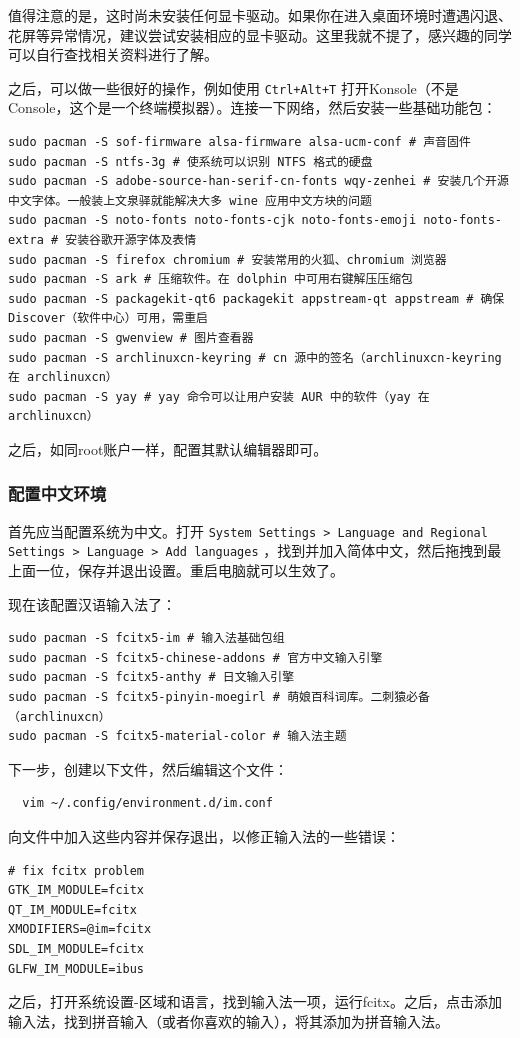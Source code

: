 值得注意的是，这时尚未安装任何显卡驱动。如果你在进入桌面环境时遭遇闪退、花屏等异常情况，建议尝试安装相应的显卡驱动。这里我就不提了，感兴趣的同学可以自行查找相关资料进行了解。

之后，可以做一些很好的操作，例如使用 \texttt{Ctrl+Alt+T} 打开Konsole（不是Console，这个是一个终端模拟器）。连接一下网络，然后安装一些基础功能包：
\begin{verbatim}
sudo pacman -S sof-firmware alsa-firmware alsa-ucm-conf # 声音固件
sudo pacman -S ntfs-3g # 使系统可以识别 NTFS 格式的硬盘
sudo pacman -S adobe-source-han-serif-cn-fonts wqy-zenhei # 安装几个开源中文字体。一般装上文泉驿就能解决大多 wine 应用中文方块的问题
sudo pacman -S noto-fonts noto-fonts-cjk noto-fonts-emoji noto-fonts-extra # 安装谷歌开源字体及表情
sudo pacman -S firefox chromium # 安装常用的火狐、chromium 浏览器
sudo pacman -S ark # 压缩软件。在 dolphin 中可用右键解压压缩包
sudo pacman -S packagekit-qt6 packagekit appstream-qt appstream # 确保 Discover（软件中心）可用，需重启
sudo pacman -S gwenview # 图片查看器
sudo pacman -S archlinuxcn-keyring # cn 源中的签名（archlinuxcn-keyring 在 archlinuxcn）
sudo pacman -S yay # yay 命令可以让用户安装 AUR 中的软件（yay 在 archlinuxcn）
\end{verbatim}

之后，如同root账户一样，配置其默认编辑器即可。

\subsubsection{配置中文环境}

首先应当配置系统为中文。打开 \texttt{System Settings > Language and Regional Settings > Language > Add languages} ，找到并加入简体中文，然后拖拽到最上面一位，保存并退出设置。重启电脑就可以生效了。

现在该配置汉语输入法了：
\begin{verbatim}
sudo pacman -S fcitx5-im # 输入法基础包组
sudo pacman -S fcitx5-chinese-addons # 官方中文输入引擎
sudo pacman -S fcitx5-anthy # 日文输入引擎
sudo pacman -S fcitx5-pinyin-moegirl # 萌娘百科词库。二刺猿必备（archlinuxcn）
sudo pacman -S fcitx5-material-color # 输入法主题
\end{verbatim}
下一步，创建以下文件，然后编辑这个文件：
\begin{verbatim}
  vim ~/.config/environment.d/im.conf
\end{verbatim}
向文件中加入这些内容并保存退出，以修正输入法的一些错误：
\begin{verbatim}
# fix fcitx problem
GTK_IM_MODULE=fcitx
QT_IM_MODULE=fcitx
XMODIFIERS=@im=fcitx
SDL_IM_MODULE=fcitx
GLFW_IM_MODULE=ibus
\end{verbatim}
之后，打开系统设置-区域和语言，找到输入法一项，运行fcitx。之后，点击添加输入法，找到拼音输入（或者你喜欢的输入），将其添加为拼音输入法。

